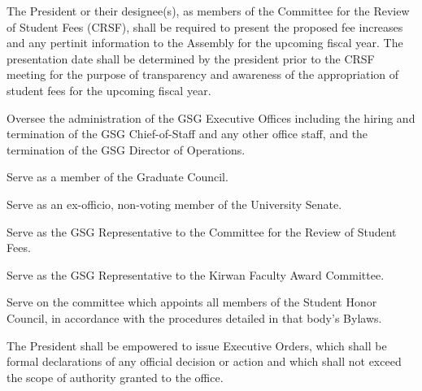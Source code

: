 \begin{bylaws-number}
\begin{bylaws-number}
\begin{enumerate}[i]
    \end{enumerate}
    \item The President or their designee(s), as members of the Committee for the Review of Student Fees (CRSF), shall be required to present the proposed fee increases and any pertinit information to the Assembly for the upcoming fiscal year. The presentation date shall be determined by the president prior to the CRSF meeting for the purpose of transparency and awareness of the appropriation of student fees for the upcoming fiscal year.
    \item Oversee the administration of the GSG Executive Offices including the hiring and termination of the GSG Chief-of-Staff and any other office staff, and the termination of the GSG Director of Operations.
    \item Serve as a member of the Graduate Council.
    \item Serve as an ex-officio, non-voting member of the University Senate.
    \item Serve as the GSG Representative to the Committee for the Review of Student Fees.
    \item Serve as the GSG Representative to the Kirwan Faculty Award Committee.
    \item Serve on the committee which appoints all members of the Student Honor Council, in accordance with the procedures detailed in that body’s Bylaws.
  \end{bylaws-number}
  \item The President shall be empowered to issue Executive Orders, which shall be formal declarations of any official decision or action and which shall not exceed the scope of authority granted to the office.
\end{bylaws-number}

